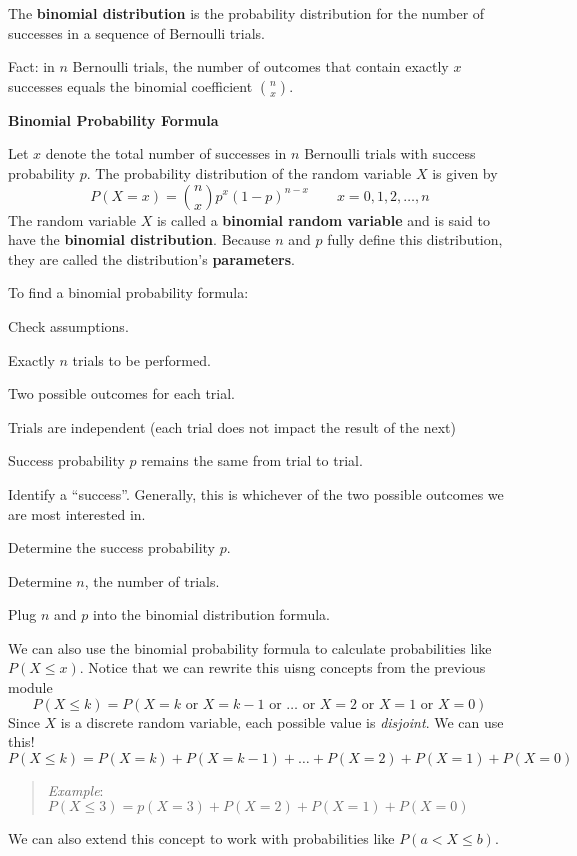 \documentclass[
]{book}
\begin{document}
The \textbf{binomial distribution} is the probability distribution for the number of successes in a sequence of Bernoulli trials.

Fact: in \(n\) Bernoulli trials, the number of outcomes that contain exactly \(x\) successes equals the binomial coefficient \(\binom{n}{x}\).

\textbf{Binomial Probability Formula}

Let \(x\) denote the total number of successes in \(n\) Bernoulli trials with success probability \(p\). The probability distribution of the random variable \(X\) is given by \[P(X=x) = \binom{n}{x}p^x(1-p)^{n-x} \quad\quad x = 0,1,2,\dots,n\] The random variable \(X\) is called a \textbf{binomial random variable} and is said to have the \textbf{binomial distribution}. Because \(n\) and \(p\) fully define this distribution, they are called the distribution's \textbf{parameters}.

To find a binomial probability formula:

Check assumptions.

Exactly \(n\) trials to be performed.

Two possible outcomes for each trial.

Trials are independent (each trial does not impact the result of the next)

Success probability \(p\) remains the same from trial to trial.

Identify a ``success''. Generally, this is whichever of the two possible outcomes we are most interested in.

Determine the success probability \(p\).

Determine \(n\), the number of trials.

Plug \(n\) and \(p\) into the binomial distribution formula.

We can also use the binomial probability formula to calculate probabilities like \(P(X\le x)\). Notice that we can rewrite this uisng concepts from the previous module \[P(X \le k) = P(X=k \text{ or } X=k-1 \text{ or } \dots  \text{ or } X=2 \text{ or } X=1  \text{ or } X=0)\] Since \(X\) is a discrete random variable, each possible value is \emph{disjoint}. We can use this! \[P(X \le k) = P(X=k) + P(X=k-1) + \dots + P(X=2) + P(X=1) + P(X=0)\]

\begin{quote}
\emph{Example}: \(P(X \le 3) = p(X=3)+P(X=2)+P(X=1)+P(X=0)\)
\end{quote}

We can also extend this concept to work with probabilities like \(P(a < X \le b)\).
\end{document}
